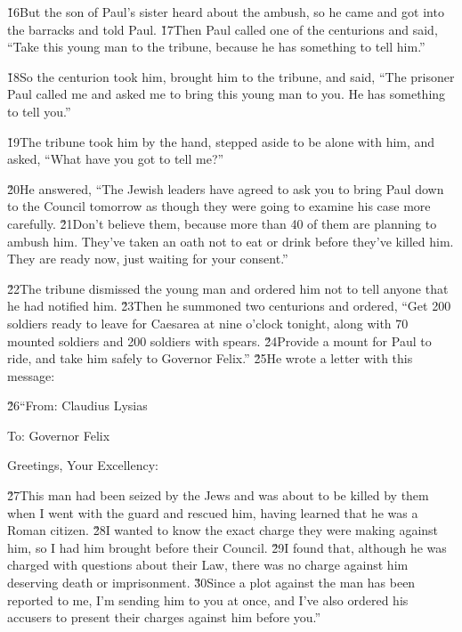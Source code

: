 \v{16}But the son of Paul's sister heard about the ambush, so he came and got into the barracks and told Paul. \v{17}Then Paul called one of the centurions and said, ``Take this young man to the tribune, because he has something to tell him.''

\v{18}So the centurion took him, brought him to the tribune, and said, ``The prisoner Paul called me and asked me to bring this young man to you. He has something to tell you.''

\v{19}The tribune took him by the hand, stepped aside to be alone with him, and asked, ``What have you got to tell me?''

\v{20}He answered, ``The Jewish leaders have agreed to ask you to bring Paul down to the Council tomorrow as though they were going to examine his case more carefully. \v{21}Don't believe them, because more than 40 of them are planning to ambush him. They've taken an oath not to eat or drink before they've killed him. They are ready now, just waiting for your consent.''

\v{22}The tribune dismissed the young man and ordered him not to tell anyone that he had notified him. \v{23}Then he summoned two centurions and ordered, ``Get 200 soldiers ready to leave for Caesarea at nine o'clock tonight, along with 70 mounted soldiers and 200 soldiers with spears. \v{24}Provide a mount for Paul to ride, and take him safely to Governor Felix.'' \v{25}He wrote a letter with this message:

\v{26}``From: Claudius Lysias

To: Governor Felix

Greetings, Your Excellency:

\v{27}This man had been seized by the Jews and was about to be killed by them when I went with the guard and rescued him, having learned that he was a Roman citizen. \v{28}I wanted to know the exact charge they were making against him, so I had him brought before their Council. \v{29}I found that, although he was charged with questions about their Law, there was no charge against him deserving death or imprisonment. \v{30}Since a plot against the man has been reported to me, I'm sending him to you at once, and I've also ordered his accusers to present their charges against him before you.''

